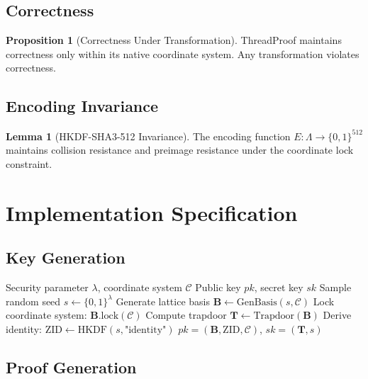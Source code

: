 \documentclass[11pt]{article}
\theoremstyle{definition}
\newtheorem{lemma}[theorem]{Lemma}
\newtheorem{proposition}[theorem]{Proposition}
\begin{document}
\subsection{Correctness}

\begin{proposition}[Correctness Under Transformation]
ThreadProof maintains correctness only within its native coordinate system. Any transformation violates correctness.
\end{proposition}

\subsection{Encoding Invariance}

\begin{lemma}[HKDF-SHA3-512 Invariance]
The encoding function $E: \Lambda \rightarrow \{0,1\}^{512}$ maintains collision resistance and preimage resistance under the coordinate lock constraint.
\end{lemma}

\section{Implementation Specification}

\subsection{Key Generation}

\begin{algorithm}
\caption{ThreadProof Key Generation}
\begin{algorithmic}[1]
\REQUIRE Security parameter $\lambda$, coordinate system $\mathcal{C}$
\ENSURE Public key $pk$, secret key $sk$
\STATE Sample random seed $s \leftarrow \{0,1\}^\lambda$
\STATE Generate lattice basis $\mathbf{B} \leftarrow \text{GenBasis}(s, \mathcal{C})$
\STATE Lock coordinate system: $\mathbf{B}.\text{lock}(\mathcal{C})$
\STATE Compute trapdoor $\mathbf{T} \leftarrow \text{Trapdoor}(\mathbf{B})$
\STATE Derive identity: $\text{ZID} \leftarrow \text{HKDF}(s, \text{"identity"})$
\RETURN $pk = (\mathbf{B}, \text{ZID}, \mathcal{C})$, $sk = (\mathbf{T}, s)$
\end{algorithmic}
\end{algorithm}

\subsection{Proof Generation}
\end{document}
